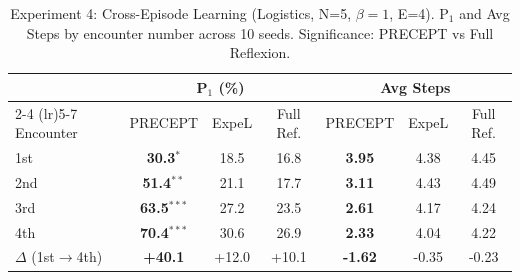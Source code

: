 \begin{table}[t]
\centering
\caption{Experiment 4: Cross-Episode Learning (Logistics, N=5, $\beta=1$, E=4). P$_1$ and Avg Steps by encounter number across 10 seeds. Significance: PRECEPT vs Full Reflexion.}
\label{tab:continuous_learning}
\begin{tabular}{l ccc ccc}
\toprule
& \multicolumn{3}{c}{\textbf{P$_1$ (\%)}} & \multicolumn{3}{c}{\textbf{Avg Steps}} \\
\cmidrule(lr){2-4} \cmidrule(lr){5-7}
Encounter & PRECEPT & ExpeL & Full Ref. & PRECEPT & ExpeL & Full Ref. \\
\midrule
  1st & \textbf{30.3}$^{*}$ & 18.5 & 16.8 & \textbf{3.95} & 4.38 & 4.45 \\
  2nd & \textbf{51.4}$^{**}$ & 21.1 & 17.7 & \textbf{3.11} & 4.43 & 4.49 \\
  3rd & \textbf{63.5}$^{***}$ & 27.2 & 23.5 & \textbf{2.61} & 4.17 & 4.24 \\
  4th & \textbf{70.4}$^{***}$ & 30.6 & 26.9 & \textbf{2.33} & 4.04 & 4.22 \\
\midrule
  $\Delta$ (1st$\to$4th) & \textbf{+40.1} & +12.0 & +10.1 & \textbf{-1.62} & -0.35 & -0.23 \\
\bottomrule
\end{tabular}
\end{table}